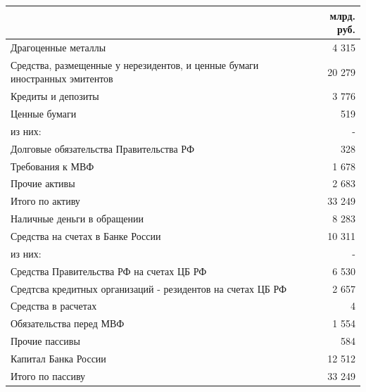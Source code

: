 \documentclass[12pt, table, a4paper,twoside]{exam}
\begin{document}
\begin{questions}
\begin{solution}[12em]
	\begin{tabularx}{\linewidth}[b]{@{}>{\raggedright\arraybackslash}Xr@{}}		& млрд. руб.\\
		\toprule
		Драгоценные металлы &               4 315    \\
		Средства, размещенные у нерезидентов, и ценные бумаги иностранных эмитентов &             20 279    \\
		Кредиты и депозиты &               3 776    \\
		Ценные бумаги &                  519    \\
		из них: & \multicolumn{1}{r}{                   -     } \\
		Долговые обязательства Правительства РФ &                  328    \\
		Требования к МВФ &               1 678    \\
		Прочие активы &               2 683    \\
		\midrule
		Итого по активу &             33 249    \\
		\midrule
		Наличные деньги в обращении &               8 283    \\
		Средства на счетах в Банке России &             10 311    \\
		из них: &                    -      \\
		Средства Правительства РФ на счетах ЦБ РФ &               6 530    \\
		Средтсва кредитных организаций - резидентов на счетах ЦБ РФ &               2 657    \\
		Средства в расчетах &                      4    \\
		Обязательства перед МВФ &               1 554    \\
		Прочие пассивы &                  584    \\
		Капитал Банка России &             12 512    \\
		\midrule
		Итого по пассиву &             33 249    \\
		\bottomrule
	\end{tabularx}%
	
\end{solution}

\vfill\null\pagebreak

\end{questions}
\end{document}
